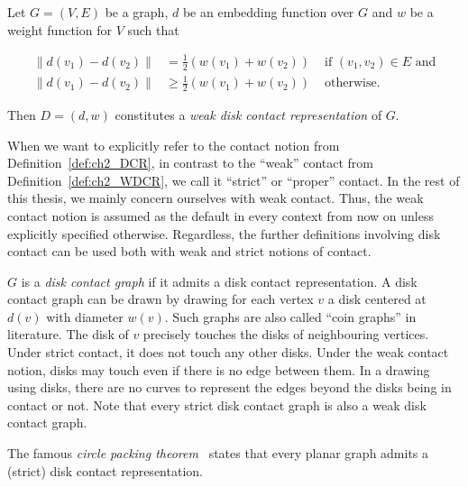 \begin{definition}
\label{def:ch2_WDCR}
Let $G = (V, E)$ be a graph, $d$ be an embedding function over $G$ and $w$ be a weight function for $V$ such that

\begin{align*}
\lVert d(v_1) - d(v_2) \rVert &= \frac12(w(v_1) + w(v_2)) &\text{ if } (v_1, v_2) \in E \text{ and} \\ \lVert d(v_1) - d(v_2) \rVert &\ge \frac12(w(v_1) + w(v_2)) &\text{ otherwise.}
\end{align*}

Then $D = (d, w)$ constitutes a \emph{weak disk contact representation} of $G$.
\end{definition}

When we want to explicitly refer to the contact notion from Definition~\ref{def:ch2_DCR}, in contrast to the ``weak'' contact from Definition~\ref{def:ch2_WDCR}, we call it ``strict'' or ``proper'' contact. In the rest of this thesis, we mainly concern ourselves with weak contact. Thus, the weak contact notion is assumed as the default in every context from now on unless explicitly specified otherwise. Regardless, the further definitions involving disk contact can be used both with weak and strict notions of contact.

$G$ is a \emph{disk contact graph} if it admits a disk contact representation. A disk contact graph can be drawn by drawing for each vertex $v$ a disk centered at $d(v)$ with diameter $w(v)$. Such graphs are also called ``coin graphs'' in literature. The disk of $v$ precisely touches the disks of neighbouring vertices. Under strict contact, it does not touch any other disks. Under the weak contact notion, disks may touch even if there is no edge between them. In a drawing using disks, there are no curves to represent the edges beyond the disks being in contact or not. Note that every strict disk contact graph is also a weak disk contact graph.


The famous \emph{circle packing theorem}~\cite{Koebe1936} states that every planar graph admits a (strict) disk contact representation.

